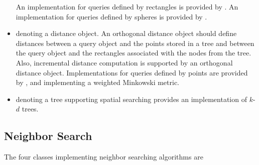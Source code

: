 \begin{itemize}
An implementation for queries defined by rectangles is provided by
.
An implementation for queries defined by spheres is provided by
.

\item
{} denoting a distance object. An orthogonal distance object should define distances 
between a query object and the points stored in a tree and between the
query object and the rectangles associated with the nodes from the
tree.  Also, incremental distance computation is supported by an
orthogonal distance object.  Implementations for queries defined by
points are provided by ,
and
 implementing 
a weighted Minkowski metric.

\item
{} denoting a tree supporting spatial searching 
 provides an implementation of $k$-$d$ trees.

\end{itemize}

\subsection{Neighbor Search}

The four classes implementing neighbor searching algorithms are

